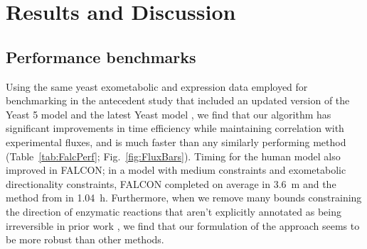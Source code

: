 


\section{Results and Discussion}

\subsection{Performance benchmarks}
Using the same yeast exometabolic and expression data employed for
benchmarking in the antecedent study \citep{Lee2012} that included an
updated version of the Yeast 5 model \citep{Heavner2012} and the latest
Yeast model \citep{Aung2013}, we find that
our algorithm has significant improvements in time efficiency while
maintaining correlation with experimental fluxes, and is much faster 
than any similarly performing method (Table~\ref{tab:FalcPerf}; 
\suppOrApp Fig.~\ref{fig:FluxBars}).
Timing for the human model also improved in FALCON; in a model with
medium constraints and exometabolic directionality constraints, FALCON
completed on average in 3.6~m and the method from \citealt{Lee2012} in
1.04~h. Furthermore, when we remove many bounds constraining the
direction of enzymatic reactions that aren't explicitly annotated as
being irreversible in prior work \citep{Lee2012}, we find that our
formulation of the approach seems to be more robust than other
methods.


